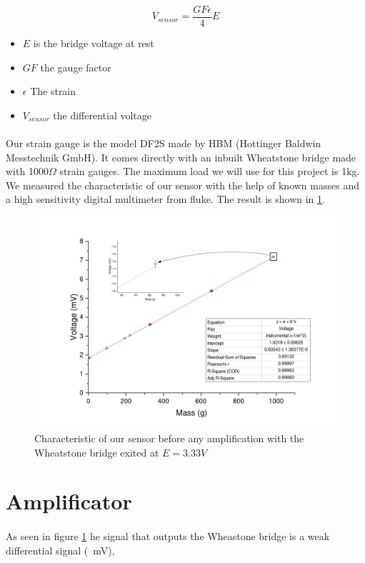 \documentclass{article}[12pt]
\begin{document}
\begin{equation}
V_{sensor}=\dfrac{GF \epsilon}{4}E
\end{equation}
\begin{itemize}
\item $E$ is the bridge voltage at rest
\item $GF$ the gauge factor
\item $\epsilon$ The strain
\item $V_{sensor}$ the differential voltage
\end{itemize}
\paragraph{}
Our strain gauge is the model DF2S made by HBM (Hottinger Baldwin Messtechnik GmbH). It comes directly with an inbuilt Wheatstone bridge made with 1000$\Omega$ strain gauges. The maximum load we will use for this project is 1kg. We measured the characteristic of our sensor with the help of known masses and a high sensitivity digital multimeter from fluke. The result is shown in \ref{fig:beforeamp}.
\begin{figure}[H]
	\centering
	\includegraphics[width=\textwidth]{figures/beforeamp.pdf}
	\caption{Characteristic of our sensor before any amplification with the Wheatstone bridge exited at $E=3.33V$}
	\label{fig:beforeamp}
\end{figure}

\section{Amplificator}
\paragraph{}
As seen in figure \ref{fig:beforeamp} he signal that outputs the Wheastone bridge is a weak differential signal (~mV), 
\end{document}
